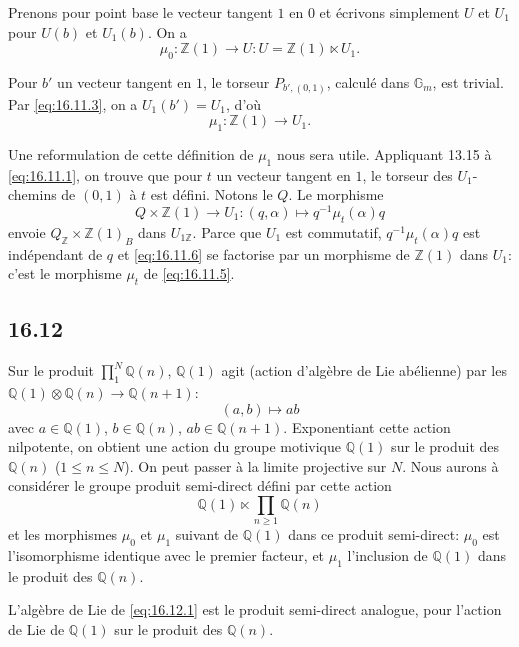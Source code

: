 \documentclass[12pt,a4paper]{article}
\theoremstyle{plain}
\theoremstyle{definition}
\theoremstyle{remark}
\newcommand{\Betti}{B}
\newcommand{\Gm}{\mathbb{G}_m}
\newcommand{\ZZ}{\mathbb{Z}}
\newcommand{\QQ}{\mathbb{Q}}
\begin{document}
Prenons pour point base le vecteur tangent $1$ en $0$ et \'ecrivons
simplement $U$ et $U_1$ pour $U(b)$ et $U_1(b)$. On a
\begin{equation}\label{eq:16.11.4}
\mu_0 : \ZZ(1) \to U : U = \ZZ(1) \ltimes U_1.
\end{equation}

Pour $b'$ un vecteur tangent en $1$, le torseur $P_{b',(0,1)}$, calcul\'e
dans $\Gm$, est trivial. Par \eqref{eq:16.11.3}, on a $U_1(b') = U_1$,
d'o\`u
\begin{equation}\label{eq:16.11.5}
\mu_1 : \ZZ(1) \to U_1.
\end{equation}

Une reformulation de cette d\'efinition de $\mu_1$ nous sera utile.
Appliquant 13.15 \`a \eqref{eq:16.11.1}, on trouve que pour $t$ un vecteur
tangent en $1$, le torseur des $U_1$-chemins de $(0,1)$ \`a $t$ est d\'efini.
Notons le $Q$. Le morphisme
\begin{equation}\label{eq:16.11.6}
Q \times \ZZ(1) \to U_1 : (q,\alpha) \mapsto q^{-1}\mu_t(\alpha)q
\end{equation}
envoie $Q_\ZZ \times \ZZ(1)_\Betti$ dans $U_{1\ZZ}$. Parce que $U_1$ est
commutatif, $q^{-1}\mu_t(\alpha)q$ est ind\'ependant de $q$ et
\eqref{eq:16.11.6} se factorise par un morphisme de $\ZZ(1)$ dans $U_1$:
c'est le morphisme $\mu_t$ de \eqref{eq:16.11.5}.

\subsection*{16.12}

Sur le produit $\prod_1^N \QQ(n)$, $\QQ(1)$ agit (action d'alg\`ebre de Lie
ab\'elienne) par les $\QQ(1) \otimes \QQ(n) \to \QQ(n+1)$:
\[
(a,b) \longmapsto ab
\]
avec $a \in \QQ(1)$, $b \in \QQ(n)$, $ab \in \QQ(n+1)$. Exponentiant cette
action nilpotente, on obtient une action du groupe motivique $\QQ(1)$ sur
le produit des $\QQ(n)$ ($1 \leq n \leq N$). On peut passer \`a la limite
projective sur $N$. Nous aurons \`a consid\'erer le groupe produit
semi-direct d\'efini par cette action
\begin{equation}\label{eq:16.12.1}
\QQ(1) \ltimes \prod_{n \geq 1} \QQ(n)
\end{equation}
et les morphismes $\mu_0$ et $\mu_1$ suivant de $\QQ(1)$ dans ce produit
semi-direct: $\mu_0$ est l'isomorphisme identique avec le premier facteur,
et $\mu_1$ l'inclusion de $\QQ(1)$ dans le produit des $\QQ(n)$.

L'alg\`ebre de Lie de \eqref{eq:16.12.1} est le produit semi-direct
analogue, pour l'action de Lie de $\QQ(1)$ sur le produit des $\QQ(n)$.
\end{document}
